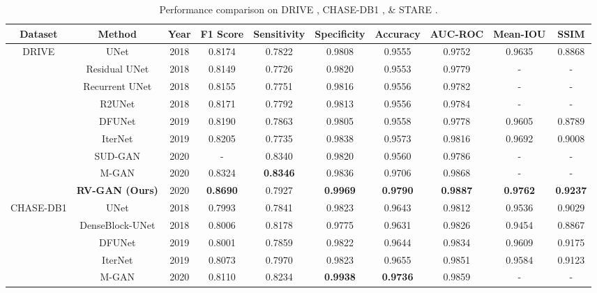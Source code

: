 \documentclass[runningheads]{llncs}
\begin{document}
\begin{table}[t!]
\centering
\caption{Performance comparison on DRIVE \cite{staal2004ridge},  CHASE-DB1 \cite{owen2009measuring}, \& STARE \cite{hoover2000locating}.}
\centering
\begin{adjustbox}{width=1\textwidth}
\begin{tabular}{c|c|c|c|c|c|c|c|c|c}
\hline
Dataset & Method & Year & F1 Score & Sensitivity & Specificity & Accuracy & AUC-ROC & Mean-IOU & SSIM \\ \hline
\multirow{9}{*}{DRIVE} & UNet \cite{jin2019dunet} & 2018 &  0.8174 &   0.7822 &  0.9808 & 0.9555 &  0.9752 & 0.9635 & 0.8868 \\ 
& Residual UNet \cite{alom2018recurrent} & 2018 & 0.8149 & 0.7726 & 0.9820 & 0.9553 & 0.9779 & -  & - \\ 
&Recurrent UNet \cite{alom2018recurrent} & 2018 & 0.8155 & 0.7751 & 0.9816 & 0.9556 & 0.9782  & - & -\\ 
& R2UNet \cite{alom2018recurrent} & 2018 & 0.8171 &0.7792 & 0.9813 & 0.9556 & 0.9784 & - &  -     \\ 
 & DFUNet \cite{jin2019dunet} & 2019 &  0.8190 & 0.7863 &  0.9805 &   0.9558 &  0.9778  & 0.9605 & 0.8789     \\
& IterNet \cite{li2020iternet} & 2019 & 0.8205 &  0.7735 & 0.9838 & 0.9573 & 0.9816& 0.9692 & 0.9008\\
& SUD-GAN \cite{yang2020sud}& 2020 & - & 0.8340 & 0.9820 & 0.9560 & 0.9786 & - & - \\
& M-GAN \cite{park2020m} & 2020 & 0.8324 & \textbf{0.8346} & 0.9836 & 0.9706 & 0.9868 & - & - \\
& \textbf{RV-GAN (Ours)} & 2020 & \textbf{0.8690} & 0.7927 & \textbf{0.9969} & \textbf{0.9790} & \textbf{0.9887} & \textbf{0.9762} & \textbf{0.9237}  \\\hline	
\multirow{6}{*}{CHASE-DB1}& UNet \cite{jin2019dunet} & 2018 & 0.7993 & 0.7841 & 0.9823 & 0.9643 & 0.9812 & 0.9536 & 0.9029\\
& DenseBlock-UNet \cite{li2018h}  & 2018 & 0.8006 & 0.8178 & 0.9775 & 0.9631 & 0.9826 &0.9454 & 0.8867 \\ 
& DFUNet \cite{jin2019dunet} & 2019 & 0.8001 & 0.7859 & 0.9822 & 0.9644 & 0.9834 &  0.9609 & 0.9175     \\
& IterNet \cite{li2020iternet} & 2019 & 0.8073 & 0.7970 & 0.9823 & 0.9655 & 0.9851 & 0.9584 & 0.9123\\
& M-GAN \cite{park2020m} & 2020 & 0.8110 & 0.8234 & \textbf{0.9938} & \textbf{0.9736} & 0.9859 & - & - \\

\end{tabular}
\end{adjustbox}
\end{table}
\end{document}
